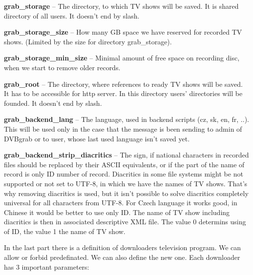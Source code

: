 \item\textbf{grab\_storage} -- The directory, to which TV shows will be saved. It is shared directory of all users. It doesn't end by slash.
\item\textbf{grab\_storage\_size} -- How many GB space we have reserved for recorded TV shows. (Limited by the size for directory grab\_storage).
\item\textbf{grab\_storage\_min\_size} -- Minimal amount of free space on recording disc, when we start to remove older records.
\item\textbf{grab\_root} -- The directory, where references to ready TV shows will be saved. It has to be accessible for http server. In this directory users' directories will be founded. It doesn't end by slash.
\item\textbf{grab\_backend\_lang} -- The language, used in backend scripts (cz, sk, en, fr, ..). This will be used only in the case that the message is been sending to admin of DVBgrab or to user, whose last used language isn't saved yet.
\item\textbf{grab\_backend\_strip\_diacritics} -- The sign, if national characters in recorded files should be replaced by their ASCII equivalents, or if the part of the name of record is only ID number of record. Diacritics in some file systems might be not supported or not set to UTF-8, in which we have the names of TV shows. That's why removing diacritics is used, but it isn't possible to solve diacritics completely universal for all characters from UTF-8. For Czech language it works good, in Chinese it would be better to use only ID. The name of TV show including diacritics is then in associated descriptive XML file. The value 0 determins using of ID, the value 1 the name of TV show.
\eitem

In the last part there is a definition of downloaders television program. We can allow or forbid predefinated. We can also define the new one. Each downloader has 3 important parameters:

